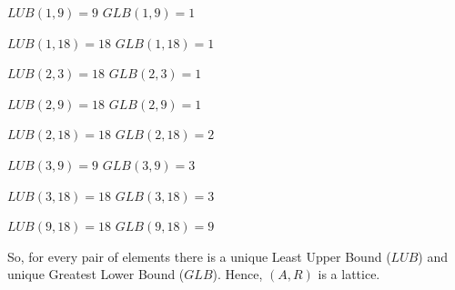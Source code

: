 \documentclass[11pt]{article}
\begin{document}
\noindent$LUB(1,9) = 9$ \space \space  \space   \space \space  \space   \space \space  \space  \space \space  \space$GLB(1,9) =1 $ \newline

\noindent$LUB(1,18) = 18$ \space \space  \space   \space \space  \space   \space \space  \space  \space \space $GLB(1,18) = 1$ \newline

\noindent$LUB(2,3) = 18$ \space \space  \space   \space \space  \space   \space \space  \space  \space \space $GLB(2,3) = 1$ \newline

\noindent$LUB(2,9) = 18$ \space \space  \space   \space \space  \space   \space \space  \space  \space \space $GLB(2,9) = 1$ \newline

\noindent$LUB(2,18) = 18$ \space \space  \space   \space \space  \space   \space \space  \space  \space \space $GLB(2,18) = 2$ \newline

\noindent$LUB(3,9) = 9 $ \space \space  \space   \space \space  \space   \space \space  \space  \space \space $GLB(3,9) = 3$ \newline

\noindent$LUB(3,18) = 18 $ \space \space  \space   \space \space  \space   \space \space  \space  \space \space $GLB(3,18) = 3 $ \newline

\noindent$LUB(9,18) = 18 $ \space \space  \space   \space \space  \space   \space \space  \space  \space \space $GLB(9,18) = 9$ \newline \newline

\noindent So, for every pair of elements there is a unique Least Upper Bound ($LUB$) and unique Greatest Lower Bound ($GLB$). \newline \newline
Hence, $(A,R)$ is a lattice. 
\end{document}
